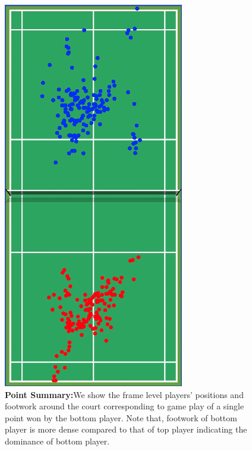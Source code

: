 \documentclass[runningheads,a4paper]{llncs}
\begin{document}
\begin{figure}[!htbp]
    \centering
    \includegraphics[width=0.8\linewidth]{Images/heatmap.png}
    \caption{\label{fig:heatmap}\textbf{Point Summary:}We show the frame level players’ positions and footwork around the court corresponding to game play of a single point won by the bottom player. Note that, footwork of bottom player is more dense compared to that of top player indicating the dominance of bottom player.}
\end{figure}
\end{document}
